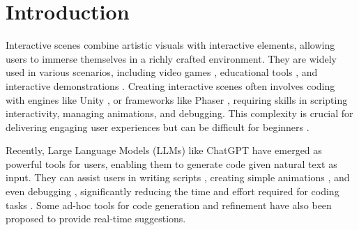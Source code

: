 \section{Introduction}
{Interactive scenes combine} %
artistic visuals with interactive elements, allowing users to immerse themselves in a richly crafted environment{. They} %
are widely used in various scenarios, including video games \cite{supermario, tetris, zelda}, educational tools \cite{khanacademy, scratch}, and interactive demonstrations \cite{phET, exploratorium}. {Creating} %
interactive scenes {often} involves coding with engines like Unity \cite{unity}, or frameworks like Phaser \cite{phaser}, requiring skills in scripting interactivity, managing animations, and debugging. This complexity %
is crucial for delivering engaging user experiences {but can be difficult for beginners} .

Recently, Large Language Models (LLMs) like ChatGPT \cite{openai_chatgpt} have emerged as powerful {tools} %
for users, enabling them to generate code {given} %
natural text as input. {They} %
can assist users in writing scripts \cite{de2024llmr}, creating {simple} animations \cite{lan2023application}, and even debugging \cite{zhang2023critical}, significantly reducing the time and effort required for coding tasks \cite{tian2023chatgpt}. Some ad-hoc tools for code generation and refinement  have also been proposed to provide real-time suggestions. 

